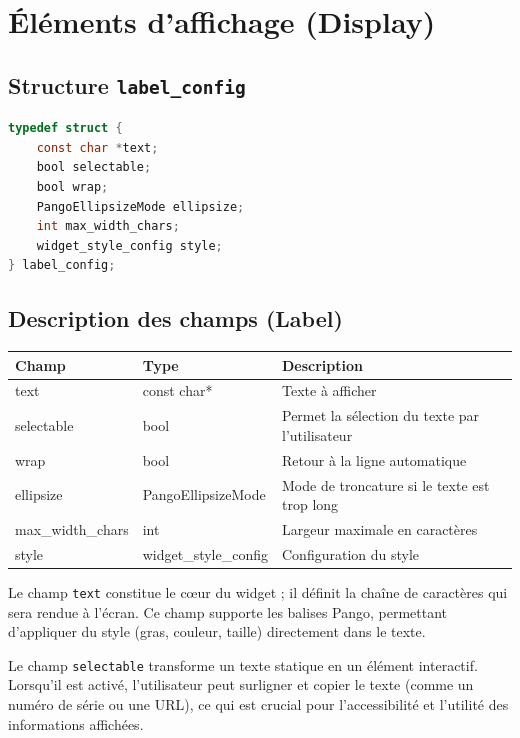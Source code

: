 \section{Éléments d'affichage (Display)}

\subsection{Structure \texttt{label\_config}}
\begin{lstlisting}[language=C]
typedef struct {
    const char *text;
    bool selectable;
    bool wrap;
    PangoEllipsizeMode ellipsize;
    int max_width_chars;
    widget_style_config style;
} label_config;
\end{lstlisting}

\subsection{Description des champs (Label)}
\begin{center}
\begin{tabular}{|l|l|p{5cm}|}
\hline
\textbf{Champ} & \textbf{Type} & \textbf{Description} \\
\hline
text & const char* & Texte à afficher \\
\hline
selectable & bool & Permet la sélection du texte par l'utilisateur \\
\hline
wrap & bool & Retour à la ligne automatique \\
\hline
ellipsize & PangoEllipsizeMode & Mode de troncature si le texte est trop long \\
\hline
max\_width\_chars & int & Largeur maximale en caractères \\
\hline
style & widget\_style\_config & Configuration du style \\
\hline
\end{tabular}
\end{center}

\bigskip

Le champ \texttt{text} constitue le cœur du widget ; il définit la chaîne de caractères qui sera rendue à l'écran. Ce champ supporte les balises Pango, permettant d'appliquer du style (gras, couleur, taille) directement dans le texte.

Le champ \texttt{selectable} transforme un texte statique en un élément interactif. Lorsqu'il est activé, l'utilisateur peut surligner et copier le texte (comme un numéro de série ou une URL), ce qui est crucial pour l'accessibilité et l'utilité des informations affichées.

